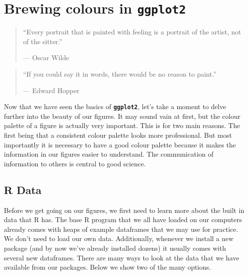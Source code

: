 \documentclass[
]{book}
\begin{document}
\hypertarget{brewing}{%
\chapter{\texorpdfstring{Brewing colours in \textbf{\texttt{ggplot2}}}{Brewing colours in ggplot2}}\label{brewing}}

\begin{quote}
``Every portrait that is painted with feeling is a portrait of the artist, not of the sitter.''

--- Oscar Wilde
\end{quote}

\begin{quote}
``If you could say it in words, there would be no reason to paint.''

--- Edward Hopper
\end{quote}

Now that we have seen the basics of \textbf{\texttt{ggplot2}}, let's take a moment to delve further into the beauty of our figures. It may sound vain at first, but the colour palette of a figure is actually very important. This is for two main reasons. The first being that a consistent colour palette looks more professional. But most importantly it is necessary to have a good colour palette because it makes the information in our figures easier to understand. The communication of information to others is central to good science.

\hypertarget{r-data}{%
\section{R Data}\label{r-data}}

Before we get going on our figures, we first need to learn more about the built in data that R has. The base R program that we all have loaded on our computers already comes with heaps of example dataframes that we may use for practice. We don't need to load our own data. Additionally, whenever we install a new package (and by now we've already installed dozens) it usually comes with several new dataframes. There are many ways to look at the data that we have available from our packages. Below we show two of the many options.
\end{document}
